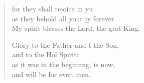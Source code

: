\begin{verse}
\begin{patverse}
for they shall rejoice in yu\Flex\\
as they behold all your jy forever.\Med\\
My spirit blesses the Lord, the grat King.

Glory to the Father and t the Son,\Med\\
and to the Hol Spirit:\\
as it was in the beginn\pointup{\i}ng, is now,\Med\\
and will be for ever. men.

  \end{patverse}
\end{verse}
